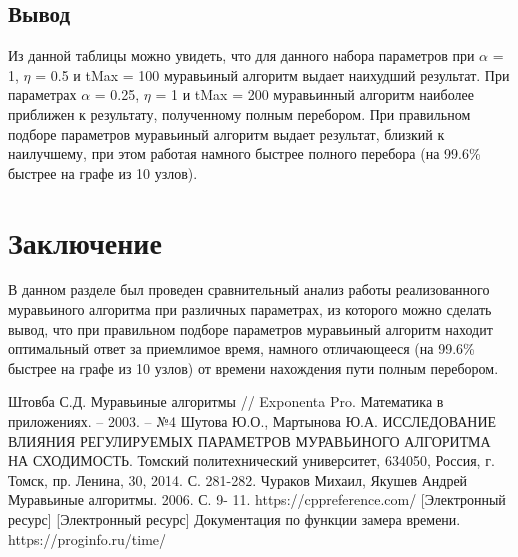 \documentclass[12pt, a4paper]{report}
\begin{document}
    \newpage
    				
    \section{Вывод}
    
    Из данной таблицы можно увидеть, что для данного набора параметров при $\alpha$ = 1, $\eta$ = 0.5 и tMax = 100 муравьиный алгоритм выдает наихудший результат. При параметрах $\alpha$ = 0.25, $\eta$ = 1 и tMax = 200 муравьинный алгоритм наиболее приближен к результату, полученному полным перебором. При правильном подборе параметров муравьиный алгоритм выдает результат, близкий к наилучшему, при этом работая намного быстрее полного перебора (на 99.6\% быстрее на графе из 10 узлов).
    

    \chapter*{Заключение}
    
    В данном разделе был проведен сравнительный анализ работы реализованного муравьиного алгоритма при различных параметрах, из которого можно сделать вывод, что при правильном подборе параметров муравьиный алгоритм находит оптимальный ответ за приемлимое время, намного отличающееся (на 99.6\% быстрее на графе из 10 узлов) от времени нахождения пути полным перебором.
    
    \newpage
    
    \begin{thebibliography}{9}
    	 Штовба С.Д. Муравьиные алгоритмы // Exponenta Pro. Математика в приложениях. – 2003. – №4
    	 Шутова Ю.О., Мартынова Ю.А. ИССЛЕДОВАНИЕ ВЛИЯНИЯ РЕГУЛИРУЕМЫХ ПАРАМЕТРОВ МУРАВЬИНОГО АЛГОРИТМА НА СХОДИМОСТЬ. Томский политехнический университет, 634050, Россия, г. Томск, пр. Ленина, 30, 2014. С. 281-282.
    	 Чураков Михаил, Якушев Андрей Муравьиные алгоритмы. 2006. С. 9-
    	11.
    	 https://cppreference.com/ [Электронный ресурс]
    	[Электронный ресурс] Документация по функции замера времени. https://proginfo.ru/time/
    \end{thebibliography}
\end{document}
